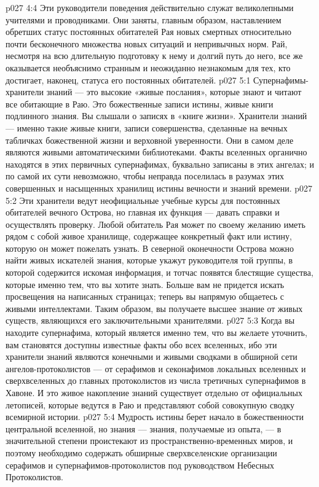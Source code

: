\vs p027 4:4 Эти руководители поведения действительно служат великолепными учителями и проводниками. Они заняты, главным образом, наставлением обретших статус постоянных обитателей Рая новых смертных относительно почти бесконечного множества новых ситуаций и непривычных норм. Рай, несмотря на всю длительную подготовку к нему и долгий путь до него, все же оказывается необъяснимо странным и неожиданно незнакомым для тех, кто достигает, наконец, статуса его постоянных обитателей.
\vs p027 5:1 Супернафимы\hyp{}хранители знаний --- это высокие «живые послания», которые знают и читают все обитающие в Раю. Это божественные записи истины, живые книги подлинного знания. Вы слышали о записях в «книге жизни». Хранители знаний --- именно такие живые книги, записи совершенства, сделанные на вечных табличках божественной жизни и верховной уверенности. Они в самом деле являются живыми автоматическими библиотеками. Факты вселенных органично находятся в этих первичных супернафимах, буквально записаны в этих ангелах; и по самой их сути невозможно, чтобы неправда поселилась в разумах этих совершенных и насыщенных хранилищ истины вечности и знаний времени.
\vs p027 5:2 Эти хранители ведут неофициальные учебные курсы для постоянных обитателей вечного Острова, но главная их функция --- давать справки и осуществлять проверку. Любой обитатель Рая может по своему желанию иметь рядом с собой живое хранилище, содержащее конкретный факт или истину, которую он может пожелать узнать. В северной оконечности Острова можно найти живых искателей знания, которые укажут руководителя той группы, в которой содержится искомая информация, и тотчас появятся блестящие существа, которые  именно тем, что вы хотите знать. Больше вам не придется искать просвещения на написанных страницах; теперь вы напрямую общаетесь с живыми интеллектами. Таким образом, вы получаете высшее знание от живых существ, являющихся его заключительными хранителями.
\vs p027 5:3 Когда вы находите супернафима, который является именно тем, что вы желаете уточнить, вам становятся доступны  известные факты обо всех вселенных, ибо эти хранители знаний являются конечными и живыми сводками в обширной сети ангелов\hyp{}протоколистов --- от серафимов и секонафимов локальных вселенных и сверхвселенных до главных протоколистов из числа третичных супернафимов в Хавоне. И это живое накопление знаний существует отдельно от официальных летописей, которые ведутся в Раю и представляют собой совокупную сводку всемирной истории.
\vs p027 5:4 Мудрость истины берет начало в божественности центральной вселенной, но знания --- знания, получаемые из опыта, --- в значительной степени проистекают из пространственно\hyp{}временных миров, и поэтому необходимо содержать обширные сверхвселенские организации серафимов и супернафимов\hyp{}протоколистов под руководством Небесных Протоколистов.
